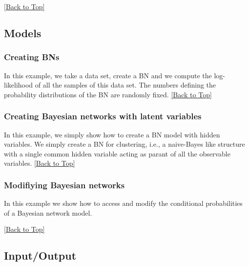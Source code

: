 \documentclass[10pt,a4paper]{article}
\begin{document}


\hyperref[sec:bns]{[Back to Top]}\newline 


\subsection{Models}\label{sec:bns:models}

\subsubsection{Creating BNs}\label{sec:bns:models:creating}
In this example, we take a data set, create a BN and we compute the log-likelihood of all the samples of this data set. The numbers defining the probability distributions of the BN are randomly fixed.
\hyperref[sec:bns]{[Back to Top]}\newline 

\subsubsection{Creating Bayesian networks with latent variables}\label{sec:bns:models:creatinglatent}
In this example, we simply show how to create a BN model with hidden variables. We simply create a BN for clustering, i.e., a naive-Bayes like structure with a single common hidden variable acting as parant of all the observable variables.
\hyperref[sec:bns]{[Back to Top]}\newline 

\subsubsection{Modifiying Bayesian networks}\label{sec:bns:models:modif}
In this example we show how to access and modify the conditional probabilities of a Bayesian network model.

\hyperref[sec:bns]{[Back to Top]}\newline 


\subsection{Input/Output}\label{sec:bns:io}
\end{document}
